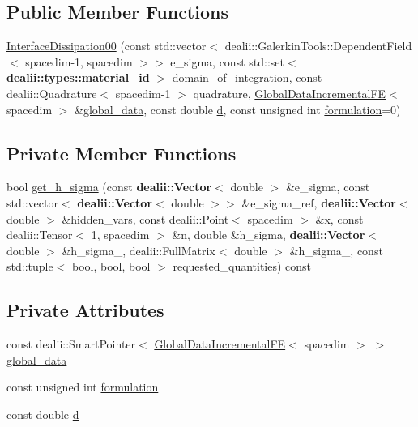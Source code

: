 \subsection*{Public Member Functions}
\begin{DoxyCompactItemize}
\item 
\hyperlink{classincremental_f_e_1_1_interface_dissipation00_a9fd7782fc7ffbe3578590b5efa77c087}{Interface\+Dissipation00} (const std\+::vector$<$ dealii\+::\+Galerkin\+Tools\+::\+Dependent\+Field$<$ spacedim-\/1, spacedim $>$$>$ e\+\_\+sigma, const std\+::set$<$ {\bf dealii\+::types\+::material\+\_\+id} $>$ domain\+\_\+of\+\_\+integration, const dealii\+::\+Quadrature$<$ spacedim-\/1 $>$ quadrature, \hyperlink{classincremental_f_e_1_1_global_data_incremental_f_e}{Global\+Data\+Incremental\+FE}$<$ spacedim $>$ \&\hyperlink{classincremental_f_e_1_1_interface_dissipation00_a4523806aae4061757a3c07c10081a4b0}{global\+\_\+data}, const double \hyperlink{classincremental_f_e_1_1_interface_dissipation00_a4d63c472bff8faf4f9b353210abe0408}{d}, const unsigned int \hyperlink{classincremental_f_e_1_1_interface_dissipation00_af553895ff96caf817cbc2a4c66800384}{formulation}=0)
\end{DoxyCompactItemize}
\subsection*{Private Member Functions}
\begin{DoxyCompactItemize}
\item 
bool \hyperlink{classincremental_f_e_1_1_interface_dissipation00_aaadc16d120e7671e16f2658a4fd969dc}{get\+\_\+h\+\_\+sigma} (const {\bf dealii\+::\+Vector}$<$ double $>$ \&e\+\_\+sigma, const std\+::vector$<$ {\bf dealii\+::\+Vector}$<$ double $>$$>$ \&e\+\_\+sigma\+\_\+ref, {\bf dealii\+::\+Vector}$<$ double $>$ \&hidden\+\_\+vars, const dealii\+::\+Point$<$ spacedim $>$ \&x, const dealii\+::\+Tensor$<$ 1, spacedim $>$ \&n, double \&h\+\_\+sigma, {\bf dealii\+::\+Vector}$<$ double $>$ \&h\+\_\+sigma\+\_, dealii\+::\+Full\+Matrix$<$ double $>$ \&h\+\_\+sigma\+\_, const std\+::tuple$<$ bool, bool, bool $>$ requested\+\_\+quantities) const 
\end{DoxyCompactItemize}
\subsection*{Private Attributes}
\begin{DoxyCompactItemize}
\item 
const dealii\+::\+Smart\+Pointer$<$ \hyperlink{classincremental_f_e_1_1_global_data_incremental_f_e}{Global\+Data\+Incremental\+FE}$<$ spacedim $>$ $>$ \hyperlink{classincremental_f_e_1_1_interface_dissipation00_a4523806aae4061757a3c07c10081a4b0}{global\+\_\+data}
\item 
const unsigned int \hyperlink{classincremental_f_e_1_1_interface_dissipation00_af553895ff96caf817cbc2a4c66800384}{formulation}
\item 
const double \hyperlink{classincremental_f_e_1_1_interface_dissipation00_a4d63c472bff8faf4f9b353210abe0408}{d}
\end{DoxyCompactItemize}


